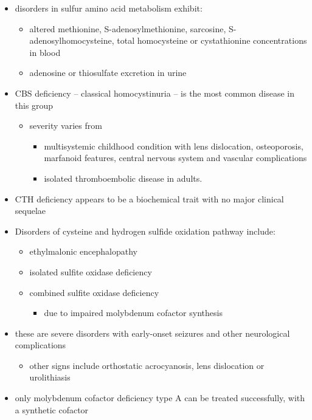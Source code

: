 \documentclass{scrartcl}
\begin{document}
\begin{itemize}
\item disorders in sulfur amino acid metabolism exhibit:
\begin{itemize}
\item altered methionine, S-adenosylmethionine, sarcosine, S-adenosylhomocysteine,
total homocysteine or cystathionine concentrations in blood
\item adenosine or thiosulfate excretion in urine
\end{itemize}
\end{itemize}


\begin{itemize}
\item CBS deficiency – classical homocystinuria – is the most common
disease in this group
\begin{itemize}
\item severity varies from
\begin{itemize}
\item multisystemic childhood condition with lens dislocation,
osteoporosis, marfanoid features, central nervous system and
vascular complications
\item isolated thromboembolic disease in adults.
\end{itemize}
\end{itemize}
\item CTH deficiency appears to be a biochemical trait with no major
clinical sequelae
\item Disorders of cysteine and hydrogen sulfide oxidation pathway include:
\begin{itemize}
\item ethylmalonic encephalopathy
\item isolated sulfite oxidase deficiency
\item combined sulfite oxidase deficiency
\begin{itemize}
\item due to impaired molybdenum cofactor synthesis
\end{itemize}
\end{itemize}
\item these are severe disorders with early-onset seizures and other
neurological complications
\begin{itemize}
\item other signs include orthostatic acrocyanosis, lens dislocation or
urolithiasis
\end{itemize}
\item only molybdenum cofactor deficiency type A can be treated
successfully, with a synthetic cofactor
\end{itemize}
\end{document}
